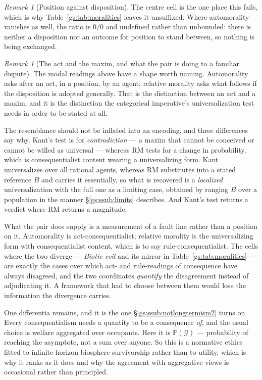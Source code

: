\documentclass[11pt]{article}
\numberwithin{equation}{section}
\theoremstyle{plain}
\theoremstyle{definition}
\theoremstyle{remark}
\newtheorem{remark}[theorem]{Remark}
\newcommand{\PP}{\mathbb{P}}
\begin{document}
\begin{remark}[Position against disposition]
The centre cell is the one place this fails, which is why
Table~\ref{gs:tab:moralities} leaves it unsuffixed. Where automorality
vanishes as well, the ratio is $0/0$ and undefined rather than unbounded:
there is neither a disposition nor an outcome for position to stand
between, so nothing is being exchanged.
\end{remark}

\begin{remark}[The act and the maxim, and what the pair is doing to a
familiar dispute]\label{gs:rem:maxim}
The modal readings above have a shape worth naming. Automorality asks
after an act, in a position, by an agent; relative morality asks what
follows if the disposition is adopted generally. That is the distinction
between an act and a maxim, and it is the distinction the categorical
imperative's universalization test needs in order to be stated at all.

The resemblance should not be inflated into an encoding, and three
differences say why. Kant's test is for \emph{contradiction} --- a maxim
that cannot be conceived or cannot be willed as universal --- whereas
$\mathrm{RM}$ tests for a change in probability, which is
consequentialist content wearing a universalizing form. Kant
universalizes over all rational agents, whereas $\mathrm{RM}$ substitutes
into a stated reference $B$ and carries it essentially, so what is
recovered is a \emph{localized} universalization with the full one as a
limiting case, obtained by ranging $B$ over a population in the manner
\S\ref{gs:ssub:limits} describes. And Kant's test returns a verdict where
$\mathrm{RM}$ returns a magnitude.

What the pair does supply is a measurement of a fault line rather than a
position on it. Automorality is act-consequentialist; relative morality
is the universalizing form with consequentialist content, which is to say
rule-consequentialist. The cells where the two diverge ---
\emph{Biotic evil} and its mirror in
Table~\ref{gs:tab:moralities} --- are exactly the cases over which act-
and rule-readings of consequence have always disagreed, and the two
coordinates \emph{quantify} the disagreement instead of adjudicating it.
A framework that had to choose between them would lose the information
the divergence carries.

One differentia remains, and it is the one \S\ref{gs:ssub:notlongtermism2}
turns on. Every consequentialism needs a quantity to be a consequence
\emph{of}, and the usual choice is welfare aggregated over occupants.
Here it is $\PP(\mathcal G)$ --- probability of reaching the asymptote,
not a sum over anyone. So this is a normative ethics fitted to
infinite-horizon biosphere survivorship rather than to utility, which is
why it ranks as it does and why the agreement with aggregative views is
occasional rather than principled.
\end{remark}
\end{document}
